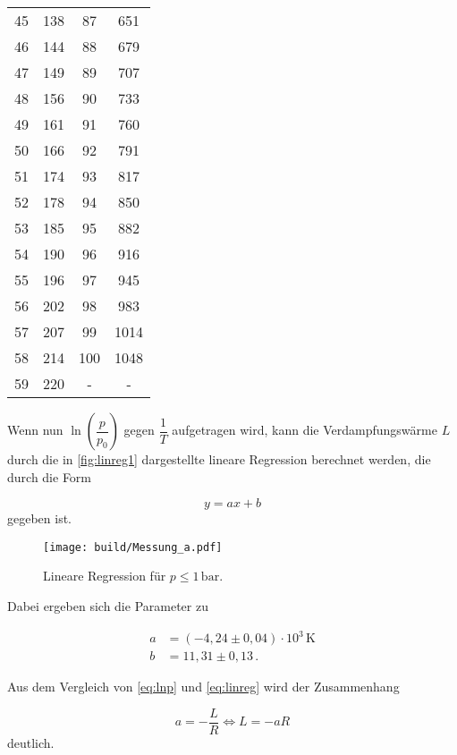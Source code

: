 \begin{table}[H]
\begin{tabular}{S[table-format=2.0] S[table-format=3.0] S[table-format=3.0] S[table-format=3.0]}
            45 & 138 & 87  & 651  \\
            46 & 144 & 88  & 679  \\
            47 & 149 & 89  & 707  \\
            48 & 156 & 90  & 733  \\
            49 & 161 & 91  & 760  \\
            50 & 166 & 92  & 791  \\
            51 & 174 & 93  & 817  \\
            52 & 178 & 94  & 850  \\
            53 & 185 & 95  & 882  \\
            54 & 190 & 96  & 916  \\
            55 & 196 & 97  & 945  \\
            56 & 202 & 98  & 983  \\
            57 & 207 & 99  & 1014 \\
            58 & 214 & 100 & 1048 \\
            59 & 220 & {-} & {-}  \\
      \bottomrule
    \end{tabular}
  \end{table}

Wenn nun $\ln{\left(\dfrac{p}{p_0} \right)}$ gegen $\dfrac{1}{T}$ aufgetragen wird, kann die Verdampfungswärme $L$ durch die in \autoref{fig:linreg1} dargestellte lineare Regression berechnet werden, die durch die Form

\begin{equation}
  y = a x + b
  \label{eq:linreg}
\end{equation} gegeben ist.

\begin{figure}
  \centering
  \texttt{[image: build/Messung\_a.pdf]}
  \caption{Lineare Regression für $p \leq 1 \,\unit{\bar}$.}
  \label{fig:linreg1}
\end{figure}

Dabei ergeben sich die Parameter zu

\begin{align*}
a & = (-4,24  \pm 0,04) \cdot 10^3 \, \unit{\kelvin}\\
b & = 11,31   \pm 0,13 \,.
\end{align*}

Aus dem Vergleich von \eqref{eq:lnp} und \eqref{eq:linreg} wird der Zusammenhang

\begin{equation*}
  a = - \frac{L}{R} \Leftrightarrow L = -a R
\end{equation*} deutlich.

